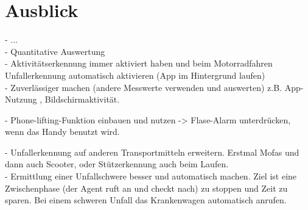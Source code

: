 \chapter{Ausblick}
- ...\\

- Quantitative Auswertung\\

- Aktivitätserkennung immer aktiviert haben und beim Motorradfahren Unfallerkennung automatisch aktivieren (App im Hintergrund laufen)\\

- Zuverlässiger machen (andere Messwerte verwenden und auswerten) z.B. App-Nutzung , Bildschirmaktivität.

- Phone-lifting-Funktion einbauen und nutzen -> Flase-Alarm unterdrücken, wenn das Handy benutzt wird.

- Unfallerkennung auf anderen Transportmitteln erweitern. Erstmal Mofas und dann auch Scooter, oder Stützerkennung auch beim Laufen.\\

- Ermittlung einer Unfallschwere besser und automatisch machen. Ziel ist eine Zwischenphase (der Agent ruft an und checkt nach) zu stoppen und Zeit zu sparen. Bei einem schweren Unfall das Krankenwagen automatisch anrufen.\\




